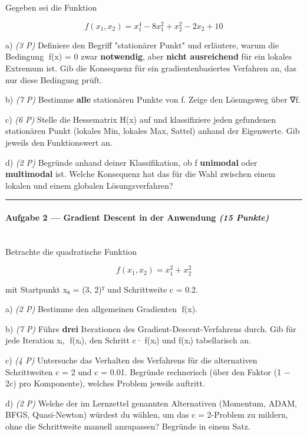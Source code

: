 \documentclass[11pt, a4paper]{article}
\begin{document}
Gegeben sei die Funktion


\[
f(x_1, x_2) = x_1^4 - 8x_1^2 + x_2^2 - 2x_2 + 10
\]


a) \textit{(3 P)} Definiere den Begriff "stationärer Punkt" und erläutere, warum die Bedingung ∇f(x⃗) = 0⃗ zwar \textbf{notwendig}, aber \textbf{nicht ausreichend} für ein lokales Extremum ist. Gib die Konsequenz für ein gradientenbasiertes Verfahren an, das nur diese Bedingung prüft.


b) \textit{(7 P)} Bestimme \textbf{alle} stationären Punkte von f. Zeige den Lösungsweg über ∇f.


c) \textit{(6 P)} Stelle die Hessematrix H(x⃗) auf und klassifiziere jeden gefundenen stationären Punkt (lokales Min, lokales Max, Sattel) anhand der Eigenwerte. Gib jeweils den Funktionswert an.


d) \textit{(2 P)} Begründe anhand deiner Klassifikation, ob f \textbf{unimodal} oder \textbf{multimodal} ist. Welche Konsequenz hat das für die Wahl zwischen einem lokalen und einem globalen Lösungsverfahren?



\noindent\textcolor{rulegray}{\rule{\linewidth}{0.4pt}}


\paragraph{Aufgabe 2 — Gradient Descent in der Anwendung \textit{(15 Punkte)}}\mbox{}\\[2pt]

Betrachte die quadratische Funktion


\[
f(x_1, x_2) = x_1^2 + x_2^2
\]


mit Startpunkt x⃗₀ = (3, 2)ᵀ und Schrittweite c = 0.2.


a) \textit{(2 P)} Bestimme den allgemeinen Gradienten ∇f(x⃗).


b) \textit{(7 P)} Führe \textbf{drei} Iterationen des Gradient-Descent-Verfahrens durch. Gib für jede Iteration x⃗ᵢ, ∇f(x⃗ᵢ), den Schritt c·∇f(x⃗ᵢ) und f(x⃗ᵢ) tabellarisch an.


c) \textit{(4 P)} Untersuche das Verhalten des Verfahrens für die alternativen Schrittweiten c = 2 und c = 0.01. Begründe rechnerisch (über den Faktor (1 − 2c) pro Komponente), welches Problem jeweils auftritt.


d) \textit{(2 P)} Welche der im Lernzettel genannten Alternativen (Momentum, ADAM, BFGS, Quasi-Newton) würdest du wählen, um das c = 2-Problem zu mildern, ohne die Schrittweite manuell anzupassen? Begründe in einem Satz.
\end{document}
